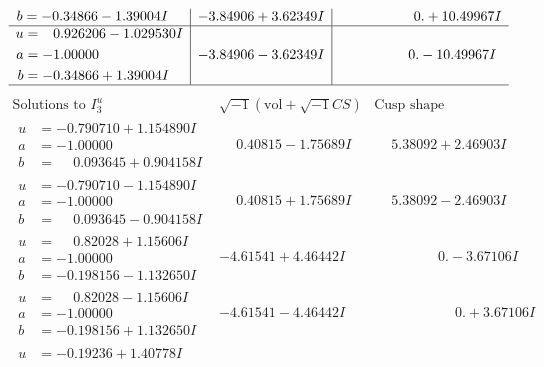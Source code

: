 \documentclass[1p]{elsarticle_modified}
\theoremstyle{definition}
\newcommand{\I}{\sqrt{-1}}
\begin{document}
$$\begin{array}{c|c|c}
\begin{aligned}
b &= -0.34866 - 1.39004 I\end{aligned}
 & -3.84906 + 3.62349 I & \phantom{-0.000000 -}0. + 10.49967 I \\ \hline\begin{aligned}
u &= \phantom{-}0.926206 - 1.029530 I \\
a &= -1.00000\phantom{ +0.000000I} \\
b &= -0.34866 + 1.39004 I\end{aligned}
 & -3.84906 - 3.62349 I & \phantom{-0.000000 } 0. - 10.49967 I\\
 \hline 
 \end{array}$$\newpage$$\begin{array}{c|c|c}  
\text{Solutions to }I^u_{3}& \I (\text{vol} + \sqrt{-1}CS) & \text{Cusp shape}\\
 \hline 
\begin{aligned}
u &= -0.790710 + 1.154890 I \\
a &= -1.00000\phantom{ +0.000000I} \\
b &= \phantom{-}0.093645 + 0.904158 I\end{aligned}
 & \phantom{-}0.40815 - 1.75689 I & \phantom{-}5.38092 + 2.46903 I \\ \hline\begin{aligned}
u &= -0.790710 - 1.154890 I \\
a &= -1.00000\phantom{ +0.000000I} \\
b &= \phantom{-}0.093645 - 0.904158 I\end{aligned}
 & \phantom{-}0.40815 + 1.75689 I & \phantom{-}5.38092 - 2.46903 I \\ \hline\begin{aligned}
u &= \phantom{-}0.82028 + 1.15606 I \\
a &= -1.00000\phantom{ +0.000000I} \\
b &= -0.198156 - 1.132650 I\end{aligned}
 & -4.61541 + 4.46442 I & \phantom{-0.000000 } 0. - 3.67106 I \\ \hline\begin{aligned}
u &= \phantom{-}0.82028 - 1.15606 I \\
a &= -1.00000\phantom{ +0.000000I} \\
b &= -0.198156 + 1.132650 I\end{aligned}
 & -4.61541 - 4.46442 I & \phantom{-0.000000 -}0. + 3.67106 I \\ \hline\begin{aligned}
u &= -0.19236 + 1.40778 I \\

\end{aligned}
\end{array}$$
\end{document}
